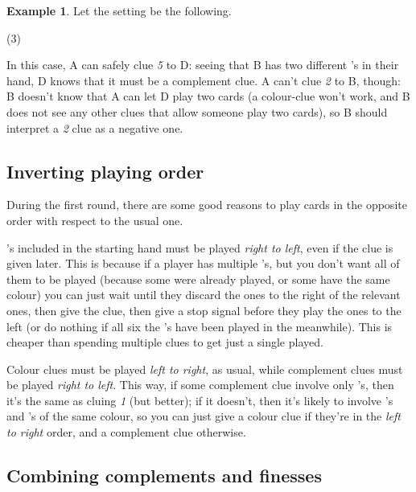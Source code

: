 \documentclass[a4paper]{article}
\theoremstyle{plain}
\theoremstyle{definition}
\newtheorem{example}[theorem]{Example}
\begin{document}
\begin{example}
	
	Let the setting be the following.
	
	\begin{tasks}(3)
		\task[+]      
		\task[A]    
		\task[B]    
		\task[C]    
		\task[D]    
		\task[E]    
	\end{tasks}
	
	In this case, A can safely clue \textit{5} to D: seeing that B has two different 's in their hand, D knows that it must be a complement clue. A can't clue \textit{2} to B, though: B doesn't know that A can let D play two cards (a colour-clue won't work, and B does not see any other clues that allow someone play two cards), so B should interpret a \textit{2} clue as a negative one.
\end{example}

\subsection{Inverting playing order}

During the first round, there are some good reasons to play cards in the opposite order with respect to the usual one.

's included in the starting hand must be played \textit{right to left}, even if the clue is given later. This is because if a player has multiple 's, but you don't want all of them to be played (because some were already played, or some have the same colour) you can just wait until they discard the ones to the right of the relevant ones, then give the clue, then give a stop signal before they play the ones to the left (or do nothing if all six the 's have been played in the meanwhile). This is cheaper than spending multiple clues to get just a single  played.

Colour clues must be played \textit{left to right}, as usual, while complement clues must be played \textit{right to left}. This way, if some complement clue involve only 's, then it's the same as cluing \textit{1} (but better); if it doesn't, then it's likely to involve 's and 's of the same colour, so you can just give a colour clue if they're in the \textit{left to right} order, and a complement clue otherwise.

\subsection{Combining complements and finesses}
\end{document}
